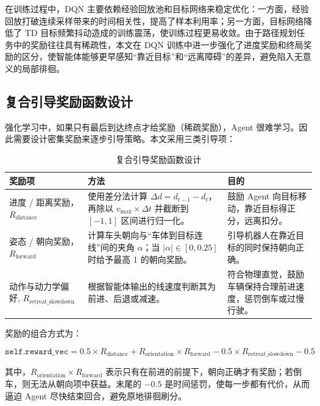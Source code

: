 \documentclass[
  oneside,
  degree=bachelor,
  fullwidthstop=false,
  fontset=fandol,
  times=false,
  minted=true,
  biblatex=true,
]{tongjithesis}
\begin{document}
在训练过程中，DQN 主要依赖经验回放池和目标网络来稳定优化：一方面，经验回放打破连续采样带来的时间相关性，提高了样本利用率；另一方面，目标网络降低了 TD 目标频繁抖动造成的训练震荡，使训练过程更易收敛。由于路径规划任务中的奖励往往具有稀疏性，本文在 DQN 训练中进一步强化了进度奖励和终局奖励的区分，使智能体能够更早感知“靠近目标”和“远离障碍”的差异，避免陷入无意义的局部徘徊。

\subsection{复合引导奖励函数设计}
强化学习中，如果只有最后到达终点才给奖励（稀疏奖励），Agent 很难学习。因此需要设计密集奖励来逐步引导策略。本文采用三类引导项：

\begin{table}[H]
    \centering
    \caption{复合引导奖励函数设计}
    \label{tab:reward_design}
    \begin{tabular}{p{}p{}p{}}
        \toprule
        \textbf{奖励项} & \textbf{方法} & \textbf{目的} \\
        \midrule
        进度 / 距离奖励，$R_{\mathrm{distance}}$  & 使用差分法计算 $\Delta d = d_{t-1} - d_t$，再除以 $v_{\max} \times \Delta t$ 并截断到 $[-1,1]$ 区间进行归一化。 & 鼓励 Agent 向目标移动，靠近目标得正分，远离扣分。 \\
        姿态 / 朝向奖励，$R_{\mathrm{forward}}$  & 计算车头朝向与“车体到目标连线”间的夹角 $\alpha$；当 $|\alpha|\in[0,0.25]$ 时给予最高 1 的朝向奖励。 & 引导机器人在靠近目标的同时保持朝向正确。 \\
        动作与动力学偏好, $R_{\mathrm{retreat\_slowdown}}$ & 根据智能体输出的线速度判断其为前进、后退或减速。 & 符合物理直觉，鼓励车辆保持合理前进速度，惩罚倒车或过慢行驶。 \\
        \bottomrule
    \end{tabular}
\end{table}

奖励的组合方式为：

\begin{equation}
    \texttt{self.reward\_vec} = 0.5 \times R_{\mathrm{distance}} + R_{\mathrm{orientation}} \times R_{\mathrm{forward}} - 0.5 \times R_{\mathrm{retreat\_slowdown}} - 0.5
\end{equation}

其中，$R_{\mathrm{orientation}} \times R_{\mathrm{forward}}$ 表示只有在前进的前提下，朝向正确才有奖励；若倒车，则无法从朝向项中获益。末尾的 $-0.5$ 是时间惩罚，使每一步都有代价，从而逼迫 Agent 尽快结束回合，避免原地徘徊刷分。
\end{document}
